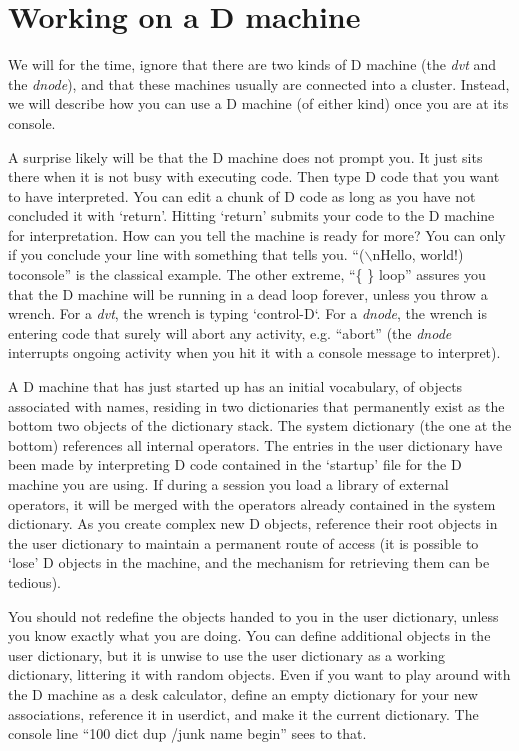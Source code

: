 
\chapter{Working on a D machine}

We will for the time, ignore that there are two kinds of D machine (the \emph{dvt} and the \emph{dnode}), and that these machines usually are connected into a cluster. Instead, we will describe how you can use a D machine (of either kind) once you are at its console.

A surprise likely will be that the D machine does not prompt you. It just sits there when it is not busy with executing code. Then type D code that you want to have interpreted. You can edit a chunk of D code as long as you have not concluded it with `return'. Hitting `return' submits your code to the D machine for interpretation. How can you tell the machine is ready for more? You can only if you conclude your line with something that tells you. ``($\backslash$nHello, world!) toconsole'' is the classical example. The other extreme, ``\{ \} loop'' assures you that the D machine will be running in a dead loop forever, unless you throw a wrench. For a \emph{dvt}, the wrench is typing `control-D`. For a \emph{dnode}, the wrench is entering code that surely will abort any activity, e.g. ``abort'' (the \emph{dnode} interrupts ongoing activity when you hit it with a console message to interpret). 

A D machine that has just started up has an initial vocabulary, of objects associated with names, residing in two dictionaries that permanently exist as the bottom two objects of the dictionary stack. The system dictionary (the one at the bottom) references all internal operators. The entries in the user dictionary have been made by interpreting D code contained in the `startup' file for the D machine you are using. If during a session you load a library of external operators, it will be merged with the operators already contained in the system dictionary. As you create complex new D objects, reference their root objects in the user dictionary to maintain a permanent route of access (it is possible to `lose' D objects in the machine, and the mechanism for retrieving them can be tedious).

You should not redefine the objects handed to you in the user dictionary, unless you know exactly what you are doing. You can define additional objects in the user dictionary, but it is unwise to use the user dictionary as a working dictionary, littering it with random objects. Even if you want to play around with the D machine as a desk calculator, define an empty dictionary for your new associations, reference it in userdict, and make it the current dictionary. The console line ``100 dict dup /junk name begin'' sees to that.


